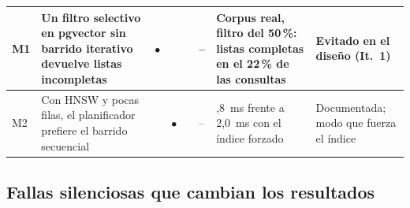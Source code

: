 {\begin{longtable}{|p{0.5cm}|>{\raggedright\arraybackslash}p{4.0cm}|c|c|c|p{0.75cm}|>{\raggedright\arraybackslash}p{3.4cm}|>{\raggedright\arraybackslash}p{2.5cm}|}
    \hline
    M1 & Un filtro selectivo en pgvector sin barrido iterativo devuelve listas incompletas & $\bullet$ &  &  & -- & Corpus real, filtro del 50\,\%: listas completas en el 22\,\% de las consultas & Evitado en el diseño (It.~1) \\
    \hline
    M2 & Con HNSW y pocas filas, el planificador prefiere el barrido secuencial &  & $\bullet$ &  & -- & 24,8~ms frente a 2,0~ms con el índice forzado & Documentada; modo que fuerza el índice \\
    \hline
\end{longtable}
}

\subsection{Fallas silenciosas que cambian los resultados}

